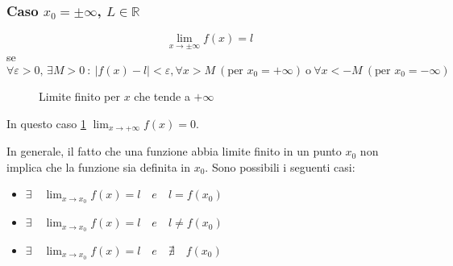 \documentclass{book}
\begin{document}
\subsubsection{\texorpdfstring{Caso \(x_0 = \pm\infty\), \(L \in \mathbb{R}\)}{Caso x_0 = pm infinito, L in R}}

\begin{definition}[Caso \(x_0 = \pm\infty\), \(l \in \mathbb{R}\)]
    \[
        \lim_{x \to \pm\infty} f(x) = l
    \]
    se
    \[
        \forall \varepsilon > 0, \, \exists M > 0 \ : \ |f(x) - l| < \varepsilon, \forall x > M \ (\text{per } x_0 = +\infty) \ \text{o} \ \forall x < -M \ (\text{per } x_0 = -\infty)
    \]
\end{definition}
\begin{figure}[H]
    \centering
    \caption{Limite finito per \(x\) che tende a \(+\infty\)}
    \label{fig:limitefinitoinfinito}
\end{figure}
In questo caso \ref{fig:limitefinitoinfinito} \(\lim_{x \to +\infty} f(x) = 0 \).

\noindent\begin{minipage}{\textwidth}
    \begin{curiosity}
        In generale, il fatto che una funzione abbia limite finito in un punto \(x_0\) non implica che la funzione sia definita in \(x_0\).
        Sono possibili i seguenti casi:
        \begin{itemize}
            \item \(\exists \quad \lim_{x \to x_0} f(x) = l \quad e \quad l = f(x_0)\)
            \item \(\exists \quad \lim_{x \to x_0} f(x) = l \quad e \quad l \neq f(x_0)\)
            \item \(\exists \quad \lim_{x \to x_0} f(x) = l \quad e \quad \nexists \quad f(x_0)\)
        \end{itemize}
    \end{curiosity}
\end{minipage}
\end{document}
